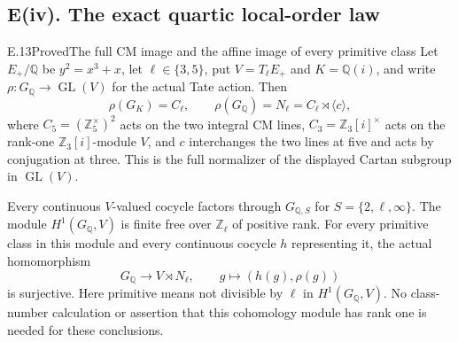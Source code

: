 \subsection*{E(iv). The exact quartic local-order law}

\begin{statement}{E.13}{Proved}{The full CM image and the affine image of every primitive class}
Let $E_+ /\mathbb Q$ be $y^2=x^3+x$, let $\ell\in\{3,5\}$,
put $V=T_\ell E_+$ and $K=\mathbb Q(i)$, and write
$\rho:G_{\mathbb Q}\to\operatorname{GL}(V)$ for the actual Tate action.
Then
\[
 \rho(G_K)=C_\ell,\qquad
 \rho(G_{\mathbb Q})=N_\ell=C_\ell\rtimes\langle c\rangle,
 \tag{E13.1}
\]
where $C_5=(\mathbb Z_5^\times)^2$ acts on the two integral CM
lines, $C_3=\mathbb Z_3[i]^\times$ acts on the rank-one
$\mathbb Z_3[i]$-module $V$, and $c$ interchanges the two lines at
five and acts by conjugation at three.  This is the full normalizer
of the displayed Cartan subgroup in $\operatorname{GL}(V)$.

Every continuous $V$-valued cocycle factors through
$G_{\mathbb Q,S}$ for $S=\{2,\ell,\infty\}$.
The module $H^1(G_{\mathbb Q},V)$ is finite free over
$\mathbb Z_\ell$ of positive rank.  For every primitive class in
this module and every continuous cocycle $h$ representing it, the
actual homomorphism
\[
 G_{\mathbb Q}\longrightarrow V\rtimes N_\ell,
 \qquad g\longmapsto(h(g),\rho(g))
 \tag{E13.2}
\]
is surjective.  Here primitive means not divisible by $\ell$ in
$H^1(G_{\mathbb Q},V)$.  No class-number calculation or assertion
that this cohomology module has rank one is needed for these conclusions.
\end{statement}
